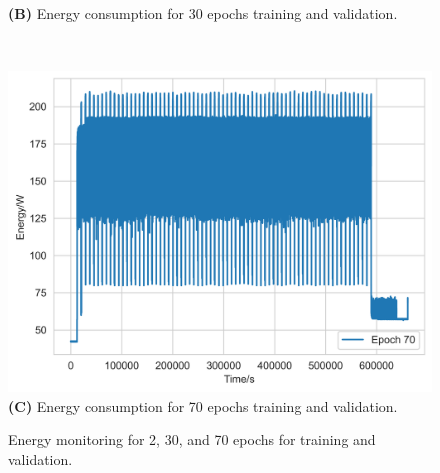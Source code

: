 \documentclass[utf8]{FrontiersinVancouver} %
\begin{document}
\begin{figure}[htb]
\begin{center}
\begin{minipage}[t]{0.30\textwidth}
        {\bf (B)} Energy consumption for 30 epochs training and validation.
     \end{minipage}
     \ \
     \begin{minipage}[t]{0.30\textwidth}
        \includegraphics[width=1.0\linewidth]{images/card-name-v100-gpu-count-1-cpu-num-6-mem-32gb-repeat-1-tfttransformerepochs-70.png}
        {\bf (C)} Energy consumption for 70 epochs training and validation.
     \end{minipage}
  \end{center}

  \caption {Energy monitoring for 2, 30, and 70 epochs for training and validation.}
  \label{fig:energy}

\end{figure}
\end{document}

